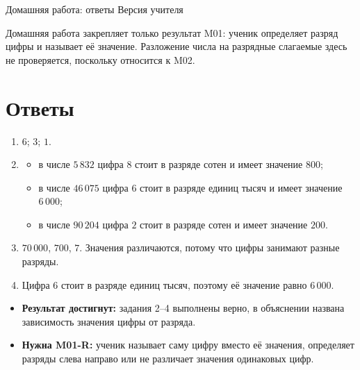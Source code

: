 \worksheettitle
  {Домашняя работа: ответы}
  { Версия учителя}

\begin{teacherbox}[Назначение]
  Домашняя работа закрепляет только результат M01: ученик определяет разряд
  цифры и называет её значение. Разложение числа на разрядные слагаемые здесь
  не проверяется, поскольку относится к M02.
\end{teacherbox}

\section{Ответы}

\begin{enumerate}[label=\textbf{\arabic*.}]
  \item \(6\); \(3\); \(1\).

  \item
    \begin{itemize}
      \item в числе \(5\,832\) цифра \(8\) стоит в разряде сотен и имеет
        значение \(800\);
      \item в числе \(46\,075\) цифра \(6\) стоит в разряде единиц тысяч и
        имеет значение \(6\,000\);
      \item в числе \(90\,204\) цифра \(2\) стоит в разряде сотен и имеет
        значение \(200\).
    \end{itemize}

  \item \(70\,000\), \(700\), \(7\). Значения различаются, потому что цифры
    занимают разные разряды.

  \item Цифра \(6\) стоит в разряде единиц тысяч, поэтому её значение равно
    \(6\,000\).
\end{enumerate}

\begin{resultbox}
  \begin{itemize}
    \item \textbf{Результат достигнут:} задания 2--4 выполнены верно, в
      объяснении названа зависимость значения цифры от разряда.
    \item \textbf{Нужна M01-R:} ученик называет саму цифру вместо её значения,
      определяет разряды слева направо или не различает значения одинаковых
      цифр.
  \end{itemize}
\end{resultbox}
